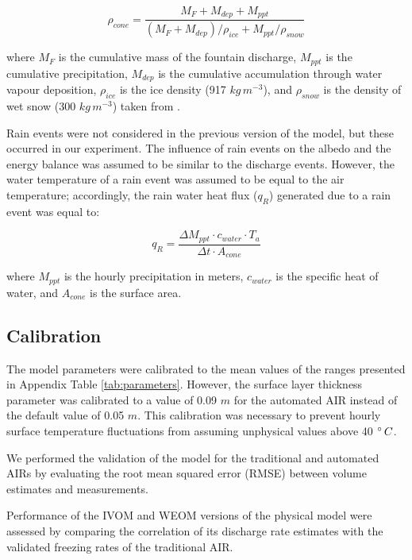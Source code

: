 \documentclass[tc, manuscript]{copernicus}
\begin{document}
\begin{equation}
  \rho_{cone} = \frac{M_{F} + M_{dep} + M_{ppt}}{(M_{F} + M_{dep})/\rho_{ice} + M_{ppt}/\rho_{snow}}
\end{equation}

where $M_F$ is the cumulative mass of the fountain discharge, $M_{ppt}$ is the cumulative precipitation,
$M_{dep}$ is the cumulative accumulation through water vapour deposition, $\rho_{ice}$ is the ice density (917
$kg\,m^{-3}$), and $\rho_{snow}$ is the density of wet snow (300 $kg\,m^{-3}$) taken from
\cite{cuffeyPhysicsGlaciers2010}.

Rain events were not considered in the previous version of the model, but these occurred in our experiment. The
influence of rain events on the albedo and the energy balance was assumed to be similar to the discharge events.
However, the water temperature of a rain event was assumed to be equal to the air temperature; accordingly, the
rain water heat flux ($q_{R}$) generated due to a rain event was equal to:

\begin{equation}
  q_{R} = \frac{\Delta M_{ppt} \cdot c_{water} \cdot T_{a}}{\Delta t \cdot A_{cone}}
\end{equation}

where $M_{ppt}$ is the hourly precipitation in meters, $c_{water}$ is the specific heat of water, and $A_{cone}$
is the surface area.

\subsection{Calibration}

The model parameters were calibrated to the mean values of the ranges presented in Appendix Table
\ref{tab:parameters}. However, the surface layer thickness parameter was calibrated to a value of 0.09 $m$ for the
automated AIR instead of the default value of 0.05 $m$. This calibration was necessary to prevent hourly surface
temperature fluctuations from assuming unphysical values above 40 $^{\circ}\,C$.

We performed the validation of the model for the traditional and automated AIRs by evaluating the root mean
squared error (RMSE) between volume estimates and measurements. 

Performance of the IVOM and WEOM versions of the physical model were assessed by comparing the correlation of its
discharge rate estimates with the validated freezing rates of the traditional AIR.
\end{document}

